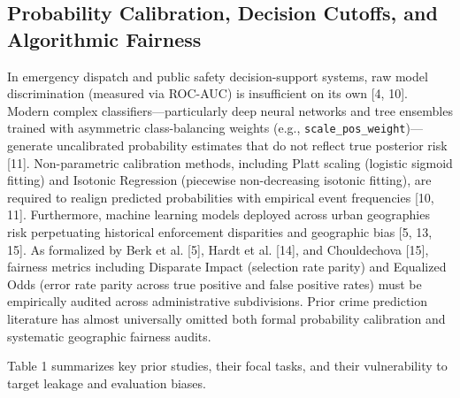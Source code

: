 \documentclass[runningheads]{llncs}
\begin{document}
\subsection{Probability Calibration, Decision Cutoffs, and Algorithmic Fairness}
In emergency dispatch and public safety decision-support systems, raw model discrimination (measured via ROC-AUC) is insufficient on its own [4, 10]. Modern complex classifiers---particularly deep neural networks and tree ensembles trained with asymmetric class-balancing weights (e.g., \texttt{scale\_pos\_weight})---generate uncalibrated probability estimates that do not reflect true posterior risk [11]. Non-parametric calibration methods, including Platt scaling (logistic sigmoid fitting) and Isotonic Regression (piecewise non-decreasing isotonic fitting), are required to realign predicted probabilities with empirical event frequencies [10, 11]. Furthermore, machine learning models deployed across urban geographies risk perpetuating historical enforcement disparities and geographic bias [5, 13, 15]. As formalized by Berk et al. [5], Hardt et al. [14], and Chouldechova [15], fairness metrics including Disparate Impact (selection rate parity) and Equalized Odds (error rate parity across true positive and false positive rates) must be empirically audited across administrative subdivisions. Prior crime prediction literature has almost universally omitted both formal probability calibration and systematic geographic fairness audits.

Table 1 summarizes key prior studies, their focal tasks, and their vulnerability to target leakage and evaluation biases.

\begin{table}[ht]
\caption{Methodological summary of prior crime prediction literature.}
\centering
{}
\end{table}
\end{document}
